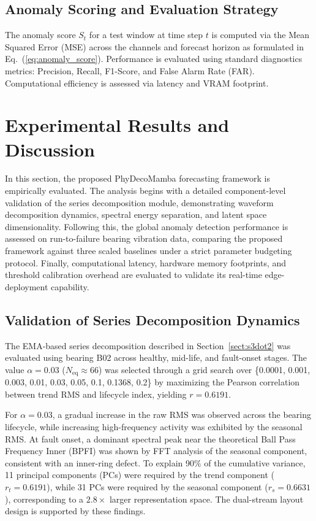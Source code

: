 \documentclass[runningheads]{llncs}
\begin{document}
\subsection{Anomaly Scoring and Evaluation Strategy} \label{sect:s4dot4}
The anomaly score $S_t$ for a test window at time step $t$ is computed via the Mean Squared Error (MSE) across the channels and forecast horizon as formulated in Eq.~(\ref{eq:anomaly_score}). Performance is evaluated using standard diagnostics metrics: Precision, Recall, F1-Score, and False Alarm Rate (FAR). Computational efficiency is assessed via latency and VRAM footprint.

\section{Experimental Results and Discussion} \label{sect:s5}
In this section, the proposed PhyDecoMamba forecasting framework is empirically evaluated. The analysis begins with a detailed component-level validation of the series decomposition module, demonstrating waveform decomposition dynamics, spectral energy separation, and latent space dimensionality. Following this, the global anomaly detection performance is assessed on run-to-failure bearing vibration data, comparing the proposed framework against three scaled baselines under a strict parameter budgeting protocol. Finally, computational latency, hardware memory footprints, and threshold calibration overhead are evaluated to validate its real-time edge-deployment capability.

\subsection{Validation of Series Decomposition Dynamics} \label{sect:s5dot1}
The EMA-based series decomposition described in Section~\ref{sect:s3dot2} was evaluated using bearing B02 across healthy, mid-life, and fault-onset stages. The value $\alpha=0.03$ ($N_{\text{eq}}\approx66$) was selected through a grid search over \{0.0001, 0.001, 0.003, 0.01, 0.03, 0.05, 0.1, 0.1368, 0.2\} by maximizing the Pearson correlation between trend RMS and lifecycle index, yielding $r=0.6191$.

For $\alpha=0.03$, a gradual increase in the raw RMS was observed across the bearing lifecycle, while increasing high-frequency activity was exhibited by the seasonal RMS. At fault onset, a dominant spectral peak near the theoretical Ball Pass Frequency Inner (BPFI) was shown by FFT analysis of the seasonal component, consistent with an inner-ring defect. To explain 90\% of the cumulative variance, 11 principal components (PCs) were required by the trend component ($r_t=0.6191$), while 31 PCs were required by the seasonal component ($r_s=0.6631$), corresponding to a $2.8\times$ larger representation space. The dual-stream layout design is supported by these findings.
\end{document}
